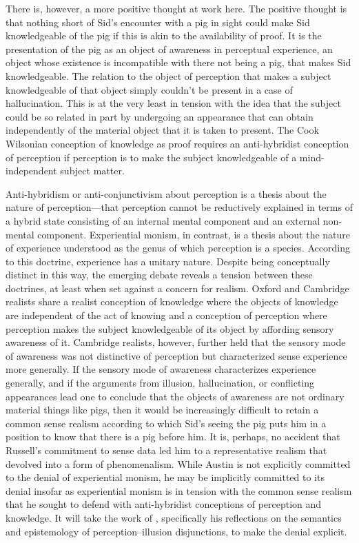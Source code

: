 \documentclass[11pt]{article}
\begin{document}
There is, however, a more positive thought at work here. The positive thought is that nothing short of Sid's encounter with a pig in sight could make Sid knowledgeable of the pig if this is akin to the availability of proof. It is the presentation of the pig as an object of awareness in perceptual experience, an object whose existence is incompatible with there not being a pig, that makes Sid knowledgeable. The relation to the object of perception that makes a subject knowledgeable of that object simply couldn't be present in a case of hallucination. This is at the very least in tension with the idea that the subject could be so related in part by undergoing an appearance that can obtain independently of the material object that it is taken to present. The Cook Wilsonian conception of knowledge as proof requires an anti-hybridist conception of perception if perception is to make the subject knowledgeable of a mind-independent subject matter. 

Anti-hybridism or anti-conjunctivism about perception is a thesis about the nature of perception---that perception cannot be reductively explained in terms of a hybrid state consisting of an internal mental component and an external non-mental component. Experiential monism, in contrast, is a thesis about the nature of experience understood as the genus of which perception is a species. According to this doctrine, experience has a unitary nature. Despite being conceptually distinct in this way, the emerging debate reveals a tension between these doctrines, at least when set against a concern for realism. Oxford and Cambridge realists share a realist conception of knowledge where the objects of knowledge are independent of the act of knowing and a conception of perception where perception makes the subject knowledgeable of its object by affording sensory awareness of it. Cambridge realists, however, further held that the sensory mode of awareness was not distinctive of perception but characterized sense experience more generally. If the sensory mode of awareness characterizes experience generally, and if the arguments from illusion, hallucination, or conflicting appearances lead one to conclude that the objects of awareness are not ordinary material things like pigs, then it would be increasingly difficult to retain a common sense realism according to which Sid's seeing the pig puts him in a position to know that there is a pig before him. It is, perhaps, no accident that Russell's commitment to sense data led him to a representative realism that devolved into a form of phenomenalism. While Austin is not explicitly committed to the denial of experiential monism, he may be implicitly committed to its denial insofar as experiential monism is in tension with the common sense realism that he sought to defend with anti-hybridist conceptions of perception and knowledge. It will take the work of \citet{Hinton:1973js}, specifically his reflections on the semantics and epistemology of perception--illusion disjunctions, to make the denial explicit.
\end{document}
